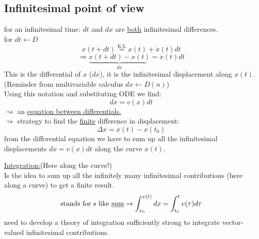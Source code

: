 \documentclass[a4paper, 12pt]{article}
\begin{document}
\subsection{Infinitesimal point of view}
for an infinitesimal time: $dt$ and $dx$ are \underline{both} infinitesimal differences.\\
for $dt \leftarrow D$
$$ x(t+dt) \overset{\text{K-L}}{=} x(t) + \dot{x}(t)dt $$
$$\Rightarrow \underbrace{x(t+dt) - x(t)}_{dx} = \dot{x}(t)dt$$
This is the differential of $x$ ($dx$), it is the infinitesimal displacement along $x(t)$.\\
(Reminder from multivariable calculus $dx \leftarrow D(n)$)\\
Using this notation and substituting ODE we find:
$$ dx = v(x)dt$$
$\rightsquigarrow$ an \underline{equation between differentials.}\\
$\rightsquigarrow$ strategy to find the \underline{finite} difference in displacement:
$$ \Delta x = x(t) - x(t_0)$$ from the differential equation we have to sum up all the infinitesimal displacements $dx = v(x)dt$ along the curve $x(t)$.
\begin{center}
\end{center}
\underline{Integration:}(Here along the curve!)\\
Is the idea to sum up all the infinitely many infinitesimal contributions (here along a curve) to get a finite result.
$$\text{stands for s like \underline{sum}} \rightarrow \int_{x_0}^{x(t)} dx = \int_{t_0}^{t} v(\tau)d\tau$$
need to develop a theory of integration sufficiently strong to integrate vector-valued infinitesimal contributions.
\end{document}
